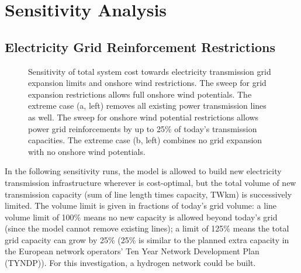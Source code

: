 \section{Sensitivity Analysis}
\label{sec:si:sensitivity}

\subsection{Electricity Grid Reinforcement Restrictions}
\label{sec:si:lv}

\begin{figure}
    \centering
    \caption{Sensitivity of total system cost towards electricity transmission grid expansion limits and onshore wind restrictions.
    The sweep for grid expansion restrictions allows full onshore wind potentials.
    The extreme case (a, left) removes all existing power transmission lines as well.
    The sweep for onshore wind potential restrictions allows power grid reinforcements by up to 25\% of today's transmission capacities.
    The extreme case (b, left) combines no grid expansion with no onshore wind potentials.}

    \label{fig:lv-onw-restriction}
\end{figure}

In the following sensitivity runs, the model is allowed to build new electricity
transmission infrastructure wherever is cost-optimal, but the total volume of
new transmission capacity (sum of line length times capacity, TWkm) is
successively limited. The volume limit is given in fractions of today's grid
volume: a line volume limit of 100\% means no new capacity is allowed beyond
today's grid (since the model cannot remove existing lines); a limit of 125\%
means the total grid capacity can grow by 25\% (25\% is similar to the planned
extra capacity in the European network operators' Ten Year Network Development
Plan (TYNDP)). For this investigation, a hydrogen network
could be built.

